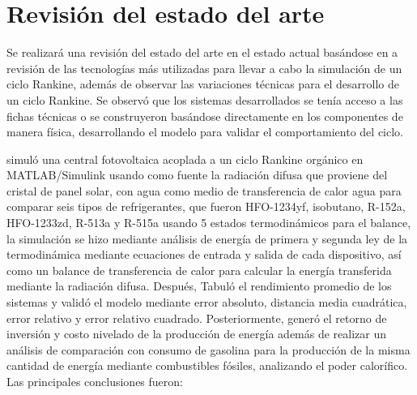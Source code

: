 \makeatletter
\let\savedchap\@makechapterhead
\def\@makechapterhead{\vspace*{-2.54cm}\savedchap}
\chapter{Revisión del estado del arte}
\let\@makechapterhead\savedchap
\makeatletter
\label{cha:Revisión del estado del a}
\vspace{-36pt}
Se realizará una revisión del estado del arte en el estado actual basándose en a revisión de las tecnologías más utilizadas para llevar a cabo la simulación de un ciclo Rankine, además de observar las variaciones técnicas para el desarrollo de un ciclo Rankine. Se observó que los sistemas desarrollados se tenía acceso a las fichas técnicas o se construyeron basándose directamente en los componentes de manera física, desarrollando el modelo para validar el comportamiento del ciclo.

\textcite{SULAIMANALSAGRI2020113435} simuló una central fotovoltaica acoplada a un ciclo Rankine orgánico en MATLAB/Simulink usando como fuente la radiación difusa que proviene del cristal de panel solar, con agua como medio de transferencia de calor agua para comparar seis tipos de refrigerantes, que fueron HFO-1234yf, isobutano, R-152a, HFO-1233zd, R-513a y R-515a usando 5 estados termodinámicos para el balance, la simulación se hizo mediante análisis de energía de primera y segunda ley de la termodinámica mediante ecuaciones de entrada y salida de cada dispositivo, así como un balance de transferencia de calor para calcular la energía transferida mediante la radiación difusa. Después, Tabuló el rendimiento promedio de los sistemas y validó el modelo mediante error absoluto, distancia media cuadrática, error relativo y error relativo cuadrado. Posteriormente, generó el retorno de inversión y costo nivelado de la producción de energía además de realizar un análisis de comparación con consumo de gasolina para la producción de la misma cantidad de energía mediante combustibles fósiles, analizando el poder calorífico. Las principales conclusiones fueron:

